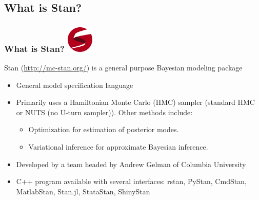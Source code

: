 \documentclass{beamer}
\begin{document}
\subsection{What is Stan?}

\begin{frame}
  \frametitle{What is Stan? \includegraphics[width=36pt,trim=0 96pt 0 0]{graphics/stan_logo.pdf}}

  Stan (\url{http://mc-stan.org/}) is a general purpose Bayesian
  modeling package \cite{stan-users-guide-219,stan-reference-manual-219,stan-functions-reference-219}
  \begin{itemize}
  \item General model specification language
  \item Primarily uses a Hamiltonian Monte Carlo (HMC) sampler
    (standard HMC or NUTS (no U-turn sampler)). Other methods include:
    \begin{itemize}
    \item Optimization for estimation of posterior modes.
    \item Variational inference for approximate Bayesian inference.
    \end{itemize}
  \item Developed by a team headed by Andrew Gelman of Columbia
    University
  \item C++ program available with several interfaces: rstan, PyStan,
    CmdStan, MatlabStan, Stan.jl, StataStan, ShinyStan
  \end{itemize}

\end{frame}
\end{document}
